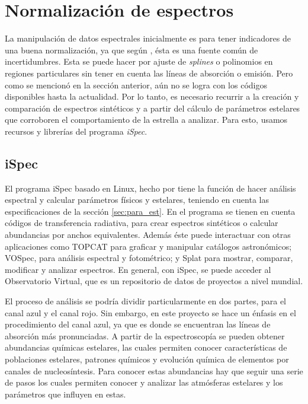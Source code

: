 \documentclass[12pt,oneside,openany,letter]{book}
\begin{document}
\section{Normalización de espectros}\label{sec:normalizacion}

\noindent La manipulación de datos espectrales inicialmente es para tener indicadores de una buena normalización, ya que según \citet{jofre2017gaia}, ésta es una fuente común de incertidumbres. Esta se puede hacer por ajuste de \textit{splines} o polinomios en regiones particulares sin tener en cuenta las líneas de absorción o emisión. Pero como se mencionó en la sección anterior, aún no se logra con los códigos disponibles hasta la actualidad. Por lo tanto, es necesario recurrir a la creación y comparación de espectros sintéticos y a partir del cálculo de parámetros estelares que corroboren el comportamiento de la estrella a analizar. Para esto, usamos recursos y librerías del programa \textit{iSpec}.

\subsection*{iSpec}
\label{sec:para_est}

\noindent El programa iSpec basado en Linux, hecho por \citet{blanco2014determining} tiene la función de hacer análisis espectral y calcular parámetros físicos y estelares, teniendo en cuenta las especificaciones de la sección \ref{sec:para_est}. En el programa se tienen en cuenta códigos de transferencia radiativa, para crear espectros sintéticos o calcular abundancias por anchos equivalentes. Además éste puede interactuar con otras aplicaciones como TOPCAT para graficar y manipular catálogos astronómicos; VOSpec, para análisis espectral y fotométrico; y Splat para mostrar, comparar, modificar y analizar espectros. En general, con iSpec, se puede acceder al Observatorio Virtual, que es un repositorio de datos de proyectos a nivel mundial.
\vspace{2mm}

\noindent El proceso de análisis se podría dividir particularmente en dos partes, para el canal azul y el canal rojo. Sin embargo, en este proyecto se hace un énfasis en el procedimiento del canal azul, ya que es donde se encuentran las líneas de absorción más pronunciadas. A partir de la espectroscopía se pueden obtener abundancias químicas estelares, las cuales permiten conocer características de poblaciones estelares, patrones químicos y evolución química de elementos por canales de nucleosíntesis. Para conocer estas abundancias hay que seguir una serie de pasos los cuales permiten conocer y analizar las atmósferas estelares y los parámetros que influyen en estas.
\end{document}
